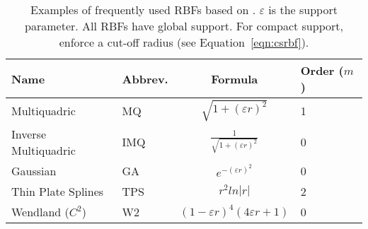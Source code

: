 
\newcommand{\rbf}[4]{#1 & #2 & #3 & #4}
\begin{table}[t]
   \centering
   \begin{tabular}{L{1.5in} | C{1.0in} | c |C{1.0in}| } %
   \rbf{Name}{Abbrev.}{Formula}{Order ($m$)} \\
   \hline\hline
   \rbf{Multiquadric}{MQ}{$\sqrt{1+(\varepsilon r)^2}$}{1} \\
   \rbf{Inverse Multiquadric}{IMQ}{$\frac{1}{\sqrt{1+(\varepsilon r)^2}}$}{0} \\
   \rbf{Gaussian}{GA}{$e^{-(\varepsilon r)^2}$}{0} \\
   \rbf{Thin Plate Splines}{TPS}{$r^2 ln |r|$}{2} \\
   \rbf{Wendland ($C^2$)}{W2}{$(1-\varepsilon r)^4 (4\varepsilon r + 1)$}{0}
   \end{tabular}
   \caption{Examples of frequently used RBFs based on \cite{Fornberg2008, Fasshauer2007}. $\varepsilon$ is the support parameter. 
   All RBFs have global support. For compact support, enforce a cut-off radius (see Equation~\ref{eqn:csrbf}).}
   \label{tbl:rbfs}
\end{table}